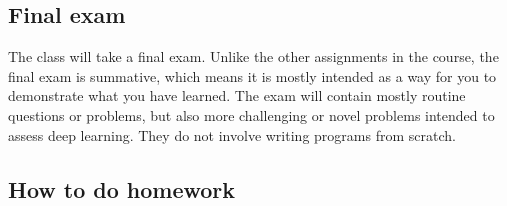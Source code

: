 \documentclass[symmetric]{tufte-handout}
\begin{document}
\subsection{Final exam}

    The class will take a final exam. Unlike the other assignments in the course, the final exam is summative,
    which means it is mostly intended as a way for you to demonstrate what you
    have learned. The exam will contain mostly routine questions or problems,
    but also more challenging or novel problems
    intended to assess deep learning. They do not involve writing programs
    from scratch. %


\subsection{How to do homework}
\label{sub:how_to_do_homework}

\end{document}
